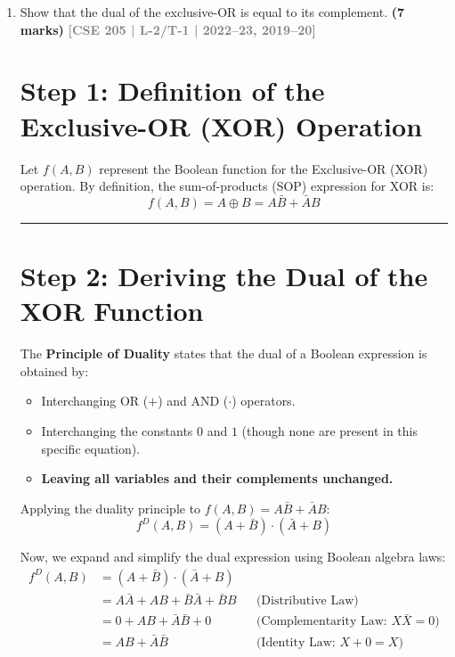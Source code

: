 \documentclass[12pt,a3paper]{article}
\newcommand{\yr}[1]{\hfill\textcolor{gray}{\small\textbf{[#1]}}}
\newcommand{\mk}[1]{\textcolor{orange!70!black}{\small\textbf{(#1 marks)}}}
\begin{document}
\begin{enumerate}


\item Show that the dual of the exclusive-OR is equal to its complement.
\mk{7} \yr{CSE 205 | L-2/T-1 | 2022--23, 2019--20}

\begin{tcolorbox}[enhanced,breakable,ansbox,colback=cA!4,colframe=cA,boxrule=0.8pt,arc=5pt,title={\textbf{Answer}},fonttitle=\bfseries\color{white},colbacktitle=cA]

\section*{Step 1: Definition of the Exclusive-OR (XOR) Operation}

Let $f(A, B)$ represent the Boolean function for the Exclusive-OR (XOR) operation. By definition, the sum-of-products (SOP) expression for XOR is:
\begin{equation}
    f(A, B) = A \oplus B = A\bar{B} + \bar{A}B
\end{equation}

\vspace{0.2cm}
\hrule
\vspace{0.4cm}

\section*{Step 2: Deriving the Dual of the XOR Function}

The \textbf{Principle of Duality} states that the dual of a Boolean expression is obtained by:
\begin{itemize}
    \item Interchanging OR ($+$) and AND ($\cdot$) operators.
    \item Interchanging the constants $0$ and $1$ (though none are present in this specific equation).
    \item \textbf{Leaving all variables and their complements unchanged.}
\end{itemize}

Applying the duality principle to $f(A, B) = A\bar{B} + \bar{A}B$:
\begin{equation}
    f^D(A, B) = (A + \bar{B}) \cdot (\bar{A} + B)
\end{equation}

Now, we expand and simplify the dual expression using Boolean algebra laws:
\begin{align*}
    f^D(A, B) &= (A + \bar{B}) \cdot (\bar{A} + B) \\
    &= A\bar{A} + AB + \bar{B}\bar{A} + \bar{B}B && \text{(Distributive Law)} \\
    &= 0 + AB + \bar{A}\bar{B} + 0 && \text{(Complementarity Law: } X\bar{X} = 0 \text{)} \\
    &= AB + \bar{A}\bar{B} && \text{(Identity Law: } X + 0 = X \text{)}
\end{align*}


\end{tcolorbox}
\end{enumerate}
\end{document}
